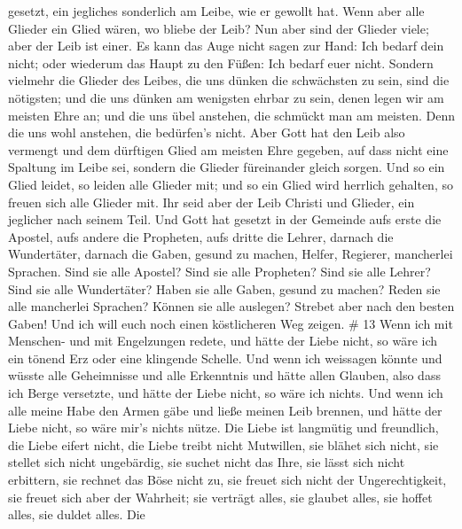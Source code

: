 gesetzt, ein jegliches sonderlich am Leibe, wie er gewollt hat.
 Wenn aber alle Glieder ein Glied wären, wo bliebe der
Leib?  Nun aber sind der Glieder viele; aber der Leib ist
einer.  Es kann das Auge nicht sagen zur Hand: Ich bedarf
dein nicht; oder wiederum das Haupt zu den Füßen: Ich bedarf euer nicht.
 Sondern vielmehr die Glieder des Leibes, die uns dünken
die schwächsten zu sein, sind die nötigsten;  und die uns
dünken am wenigsten ehrbar zu sein, denen legen wir am meisten Ehre an;
und die uns übel anstehen, die schmückt man am meisten. 
Denn die uns wohl anstehen, die bedürfen's nicht. Aber Gott hat den Leib
also vermengt und dem dürftigen Glied am meisten Ehre gegeben,
 auf dass nicht eine Spaltung im Leibe sei, sondern die
Glieder füreinander gleich sorgen.  Und so ein Glied
leidet, so leiden alle Glieder mit; und so ein Glied wird herrlich
gehalten, so freuen sich alle Glieder mit.  Ihr seid aber
der Leib Christi und Glieder, ein jeglicher nach seinem Teil.
 Und Gott hat gesetzt in der Gemeinde aufs erste die
Apostel, aufs andere die Propheten, aufs dritte die Lehrer, darnach die
Wundertäter, darnach die Gaben, gesund zu machen, Helfer, Regierer,
mancherlei Sprachen.  Sind sie alle Apostel? Sind sie alle
Propheten? Sind sie alle Lehrer? Sind sie alle Wundertäter?
 Haben sie alle Gaben, gesund zu machen? Reden sie alle
mancherlei Sprachen? Können sie alle auslegen?  Strebet
aber nach den besten Gaben! Und ich will euch noch einen köstlicheren
Weg zeigen. \# 13  Wenn ich mit Menschen- und mit
Engelzungen redete, und hätte der Liebe nicht, so wäre ich ein tönend
Erz oder eine klingende Schelle.  Und wenn ich weissagen
könnte und wüsste alle Geheimnisse und alle Erkenntnis und hätte allen
Glauben, also dass ich Berge versetzte, und hätte der Liebe nicht, so
wäre ich nichts.  Und wenn ich alle meine Habe den Armen
gäbe und ließe meinen Leib brennen, und hätte der Liebe nicht, so wäre
mir's nichts nütze.  Die Liebe ist langmütig und freundlich,
die Liebe eifert nicht, die Liebe treibt nicht Mutwillen, sie blähet
sich nicht,  sie stellet sich nicht ungebärdig, sie suchet
nicht das Ihre, sie lässt sich nicht erbittern, sie rechnet das Böse
nicht zu,  sie freuet sich nicht der Ungerechtigkeit, sie
freuet sich aber der Wahrheit;  sie verträgt alles, sie
glaubet alles, sie hoffet alles, sie duldet alles.  Die
